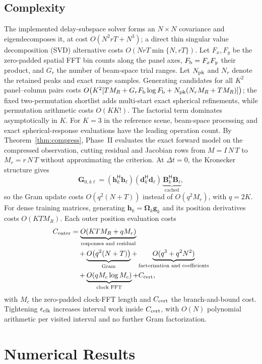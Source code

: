 \documentclass[letterpaper,journal]{IEEEtran}
\newcommand{\bd}{\mathbf{d}}
\newcommand{\bh}{\mathbf{h}}
\newcommand{\bg}{\mathbf{g}}
\newcommand{\bBm}{\mathbf{B}}
\newcommand{\bG}{\mathbf{G}}
\newcommand{\bOmega}{\boldsymbol{\Omega}}
\begin{document}
\subsection{Complexity}
The implemented delay-subspace solver forms an $N\times N$ covariance
and eigendecomposes it, at cost $O(N^2rT+N^3)$; a direct thin singular value
decomposition (SVD) alternative costs $O(NrT\min\{N,rT\})$. Let $F_x,F_y$
be the zero-padded spatial FFT bin counts along the panel axes,
$F_{\rm b}=F_xF_y$ their product, and $G_r$ the number of beam-space trial
ranges. Let $N_{\rm pk}$ and $N_r$ denote the retained peaks and exact range
samples. Generating candidates for
all $K^2$ panel--column pairs costs
$O\!\left(K^2[TM_R+G_rF_{\rm b}\log F_{\rm b}
+N_{\rm pk}(N_rM_R+TM_R)]\right)$; the fixed
two-permutation shortlist adds multi-start exact spherical refinements, while
permutation arithmetic costs $O(KK!)$. The factorial term dominates
asymptotically in $K$. For $K=3$ in the reference scene, beam-space processing
and exact spherical-response evaluations have the leading operation count.
By Theorem~\ref{thm:compress}, Phase~II
evaluates the exact forward model on the compressed observation, cutting
residual and Jacobian rows from $M=I\,N\,T$ to $M_r=r\,N\,T$ without
approximating the criterion. At $\Delta t=0$, the Kronecker structure gives
\begin{equation}
 \bG_{0,k\ell}=(\bh_k^{\mathsf H}\bh_\ell)
 (\bd_k^{\mathsf H}\bd_\ell)\,
 \underbrace{\bBm_k^{\mathsf H}\bBm_\ell}_{\text{cached}},
 \label{eq:gram_factorization}
\end{equation}
so the Gram update costs $O(q^2(N+T))$ instead of $O(q^2M_r)$, with
$q=2K$. For dense training matrices, generating $\bh_k=\bOmega_k\bg_k$
and its position derivatives costs $O(KTM_R)$. Each outer position
evaluation costs
\begin{align}
 C_{\rm outer}&=\underbrace{O(KTM_R+qM_r)}_{\text{responses and residual}}\nonumber\\
 &\quad+\underbrace{O\big(q^2(N+T)\big)}_{\text{Gram}}
 +\underbrace{O(q^3+q^2N^2)}_{\text{factorization and coefficients}}\nonumber\\
 &\quad+\underbrace{O(qM_c\log M_c)}_{\text{clock FFT}}+C_{\rm cert},
	\label{eq:cost}
\end{align}
with $M_c$ the zero-padded clock-FFT length and $C_{\rm cert}$ the
branch-and-bound cost. Tightening $\epsilon_{\rm clk}$ increases interval
work inside $C_{\rm cert}$, with $O(N)$ polynomial arithmetic per visited
interval and no further Gram factorization.
\section{Numerical Results}
\label{sec:simulation}
\end{document}
